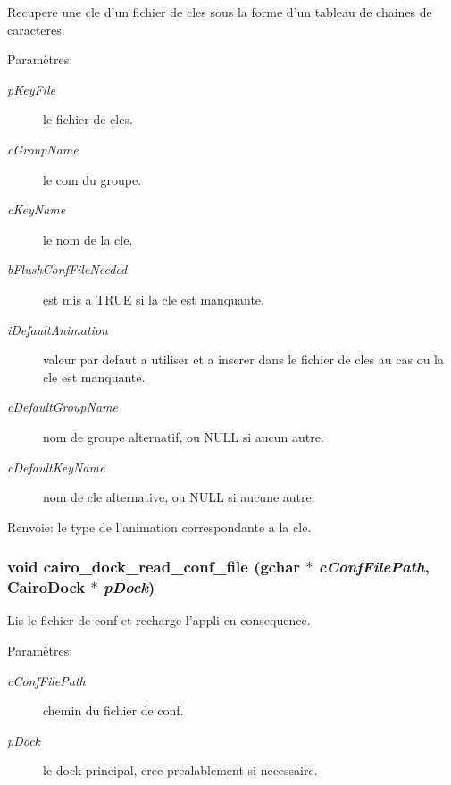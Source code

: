 Recupere une cle d'un fichier de cles sous la forme d'un tableau de chaines de caracteres. \begin{Desc}
\item[Paramètres:]
\begin{description}
\item[{\em pKeyFile}]le fichier de cles. \item[{\em cGroupName}]le com du groupe. \item[{\em cKeyName}]le nom de la cle. \item[{\em bFlushConfFileNeeded}]est mis a TRUE si la cle est manquante. \item[{\em iDefaultAnimation}]valeur par defaut a utiliser et a inserer dans le fichier de cles au cas ou la cle est manquante. \item[{\em cDefaultGroupName}]nom de groupe alternatif, ou NULL si aucun autre. \item[{\em cDefaultKeyName}]nom de cle alternative, ou NULL si aucune autre. \end{description}
\end{Desc}
\begin{Desc}
\item[Renvoie:]le type de l'animation correspondante a la cle. \end{Desc}
\subsubsection{\setlength{\rightskip}{0pt plus 5cm}void cairo\_\-dock\_\-read\_\-conf\_\-file (gchar $\ast$ {\em cConfFilePath}, {\bf CairoDock} $\ast$ {\em pDock})}\label{cairo-dock-config_8h_c64f3ee3060851d08a10b674983ceef6}


Lis le fichier de conf et recharge l'appli en consequence. \begin{Desc}
\item[Paramètres:]
\begin{description}
\item[{\em cConfFilePath}]chemin du fichier de conf. \item[{\em pDock}]le dock principal, cree prealablement si necessaire. \end{description}
\end{Desc}

